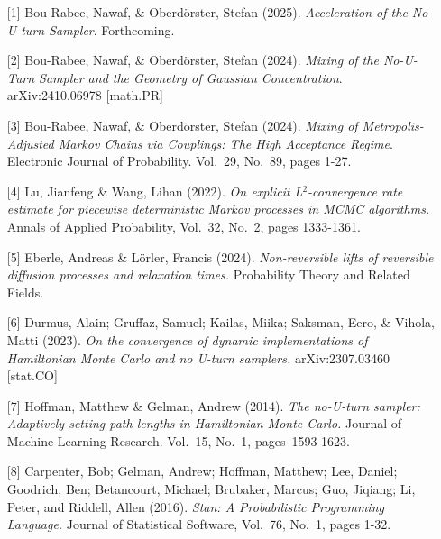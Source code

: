 \begin{talk}
\begin{enumerate}
 \item[{[1]}] Bou-Rabee, Nawaf, \& Oberd\"{o}rster, Stefan (2025). {\it Acceleration of the No-U-turn Sampler}. Forthcoming.
 \item[{[2]}] Bou-Rabee, Nawaf, \& Oberd\"{o}rster, Stefan (2024). {\it Mixing of the No-U-Turn Sampler and the Geometry of Gaussian Concentration}. arXiv:2410.06978 [math.PR]
 \item[{[3]}] Bou-Rabee, Nawaf, \& Oberd\"{o}rster, Stefan (2024). {\it Mixing of Metropolis-Adjusted Markov Chains via Couplings: The High Acceptance Regime}. Electronic Journal of Probability. Vol.~29,  No.~89, pages 1-27.  
 \item[{[4]}]  Lu, Jianfeng \& Wang, Lihan (2022). {\it On explicit L$^2$-convergence rate estimate for piecewise deterministic Markov processes in MCMC algorithms.} Annals of Applied Probability, Vol.~32, No.~2, pages 1333-1361.
 \item[{[5]}] Eberle, Andreas \& L\"{o}rler, Francis (2024). {\it Non-reversible lifts of reversible diffusion processes and relaxation times.} Probability Theory and Related Fields.
 \item[{[6]}] Durmus, Alain;  Gruffaz, Samuel;  Kailas, Miika;  Saksman, Eero, \&  Vihola, Matti (2023). {\it On the convergence of
dynamic implementations of Hamiltonian Monte Carlo and no U-turn samplers.} arXiv:2307.03460  [stat.CO] 
\item[{[7]}]  Hoffman, Matthew  \& Gelman, Andrew  (2014). {\it The no-U-turn sampler: Adaptively setting path lengths in
Hamiltonian Monte Carlo.} Journal of Machine Learning Research. Vol.~15, No.~1, pages~1593-1623.
\item[{[8]}]   Carpenter, Bob; Gelman, Andrew;  Hoffman, Matthew; Lee, Daniel;  Goodrich, Ben; Betancourt, Michael; Brubaker, Marcus;
Guo, Jiqiang; Li, Peter, and  Riddell, Allen  (2016). {\em Stan: A Probabilistic Programming Language.} Journal of
Statistical Software, Vol.~76, No.~1, pages 1-32.
\end{enumerate}
\end{talk}

